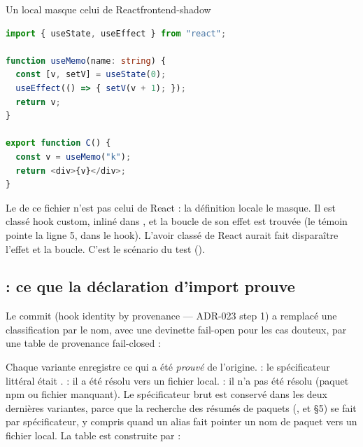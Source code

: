 \begin{exemple}{Un  local masque celui de React}{frontend-shadow}
\begin{lstlisting}[language=TypeScript,caption={\file{/tmp/ch05/shadow/Shadow.tsx}}]
import { useState, useEffect } from "react";

function useMemo(name: string) {
  const [v, setV] = useState(0);
  useEffect(() => { setV(v + 1); });
  return v;
}

export function C() {
  const v = useMemo("k");
  return <div>{v}</div>;
}
\end{lstlisting}
Le  de ce fichier n'est pas celui de React : la définition locale le masque. Il est classé hook custom, inliné dans , et la boucle de son effet est trouvée (le témoin pointe la ligne 5, dans le hook). L'avoir classé  de React aurait fait disparaître l'effet et la boucle. C'est le scénario du test  ().
\end{exemple}

\subsection{ : ce que la déclaration d'import prouve}

Le commit  (\og hook identity by provenance — ADR-023 step 1\fg{}) a remplacé une classification par le nom, avec une devinette \og fail-open\fg{} pour les cas douteux, par une table de provenance \og fail-closed\fg{} :


Chaque variante enregistre ce qui a été \emph{prouvé} de l'origine.  : le spécificateur littéral était .  : il a été résolu vers un fichier local.  : il n'a pas été résolu (paquet npm ou fichier manquant). Le spécificateur brut est conservé dans les deux dernières variantes, parce que la recherche des résumés de paquets (,  et  §5) se fait par spécificateur, y compris quand un alias  fait pointer un nom de paquet vers un fichier local. La table est construite par :

